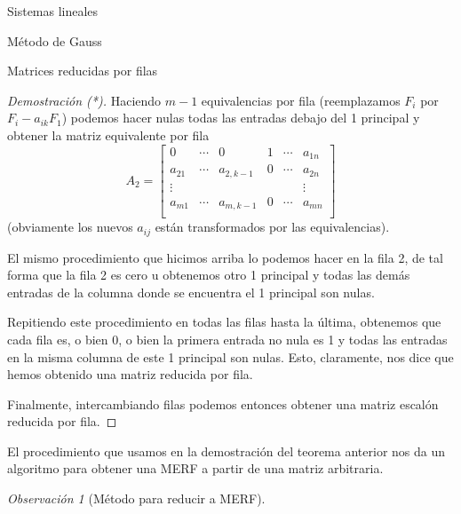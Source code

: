 \documentclass[a4paper,12pt,twoside,spanish,reqno]{amsbook}
\theoremstyle{definition}
\theoremstyle{remark}
\newtheorem{observacion}{Observaci\'on}[section]
\begin{document}
\begin{chapter}{Sistemas lineales}
\begin{section}{Método de Gauss }
\begin{subsection}{Matrices reducidas por filas}
\begin{proof}[Demostración (*)]
                    Haciendo $m-1$ equivalencias por fila (reemplazamos $F_i$ por $F_i - a_{ik}F_1$) podemos hacer nulas todas las entradas debajo del  1 principal y obtener la matriz equivalente por fila
                    \begin{equation*}
                    A_2 = \begin{bmatrix}
                    0 & \cdots & 0 & 1 & \cdots & a_{1n} \\
                    a_{21}& \cdots & a_{2,k-1} & 0 & \cdots & a_{2n} \\
                    \vdots&  &  &  &  & \vdots \\
                    a_{m1}& \cdots & a_{m,k-1} &0 & \cdots & a_{mn} \\
                    \end{bmatrix}
                    \end{equation*}
                    (obviamente los nuevos $a_{ij}$ están transformados por las equivalencias).
                    
                    El mismo procedimiento que hicimos arriba lo podemos hacer en la fila 2,  de tal forma que la fila 2 es cero u obtenemos otro 1 principal y todas las demás entradas de la columna donde se encuentra el 1 principal son nulas. 
                    
                    Repitiendo este procedimiento en todas las filas hasta la última, obtenemos que cada fila es, o bien 0, o bien la primera entrada no nula es  1 y todas las entradas en la misma columna de este 1 principal son nulas.   Esto, claramente, nos dice que hemos obtenido una matriz reducida por fila.  
                    
                 Finalmente, intercambiando filas podemos entonces obtener una matriz escalón reducida por fila.

                    
                \end{proof}
                
                El procedimiento que usamos en la demostración del teorema anterior nos da un algoritmo para obtener una MERF a partir de una matriz arbitraria.
                
                \begin{observacion}[\sc Método para reducir a MERF] \label{metodo-merf}  
                    \
                                    

\end{observacion}
\end{subsection}
\end{section}
\end{chapter}
\end{document}
